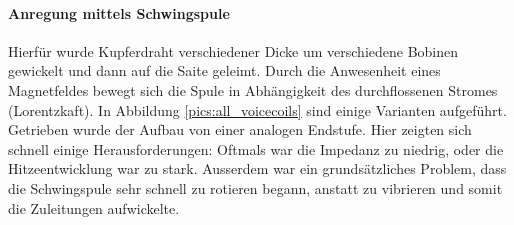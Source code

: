 \paragraph{Anregung mittels Schwingspule} Hierfür wurde Kupferdraht verschiedener Dicke um verschiedene Bobinen gewickelt und dann auf die Saite geleimt. Durch die Anwesenheit eines Magnetfeldes bewegt sich die Spule in Abhängigkeit des durchflossenen Stromes (Lorentzkaft). In Abbildung \ref{pics:all_voicecoils} sind einige Varianten aufgeführt. Getrieben wurde der Aufbau von einer analogen Endstufe. Hier zeigten sich schnell einige Herausforderungen: Oftmals war die Impedanz zu niedrig, oder die Hitzeentwicklung war zu stark. Ausserdem war ein grundsätzliches Problem, dass die Schwingspule sehr schnell zu rotieren begann, anstatt zu vibrieren und somit die Zuleitungen aufwickelte.
\begin{figure}[H]
	\centering
	\begin{subfigure}{0.7\textwidth}
		\centering

\end{subfigure}
\end{figure}
